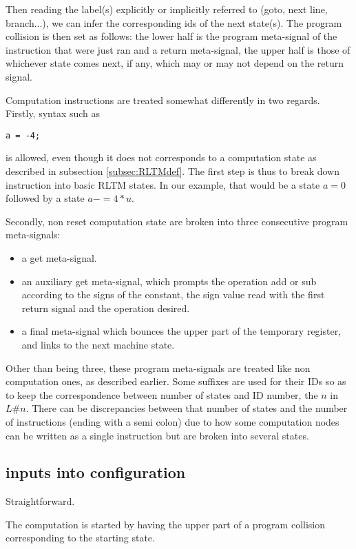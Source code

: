 Then reading the label(s) explicitly or implicitly referred to (goto, next line, branch...), we can infer the corresponding ids of the next state(s).
The program collision is then set as follows: the lower half is the program meta-signal of the instruction that were just ran and a return meta-signal, the upper half is those of whichever state comes next, if any, which may or may not depend on the return signal.

Computation instructions are treated somewhat differently in two regards.
Firstly, syntax such as 
\begin{verbatim}
a = -4;
\end{verbatim}
is allowed, even though it does not corresponds to a computation state as described in subsection \ref{subsec:RLTMdef}.
The first step is thus to break down \RLTM instruction into basic RLTM states.
In our example, that would be a state $a = 0$ followed by a state $a -= 4 * u$.

Secondly, non reset computation state are broken into three consecutive program meta-signals:
\begin{itemize}
	\item a get meta-signal.
	\item an auxiliary get meta-signal, which prompts the operation add or sub according to the signs of the constant, the sign value read with the first return signal and the operation desired.
	\item a final meta-signal which bounces the upper part of the temporary register, and links to the next machine state.
\end{itemize}

Other than being three, these program meta-signals are treated like non computation ones, as described earlier.
Some suffixes are used for their IDs so as to keep the correspondence between number of states and ID number, the $n$ in $L\#n$.
There can be discrepancies between that number of states and the number of instructions (ending with a semi colon) due to how some computation nodes can be written as a single \RLTM instruction but are broken into several states.


\subsection{inputs into configuration}
Straightforward.

The computation is started by having the upper part of a program collision corresponding to the starting state.